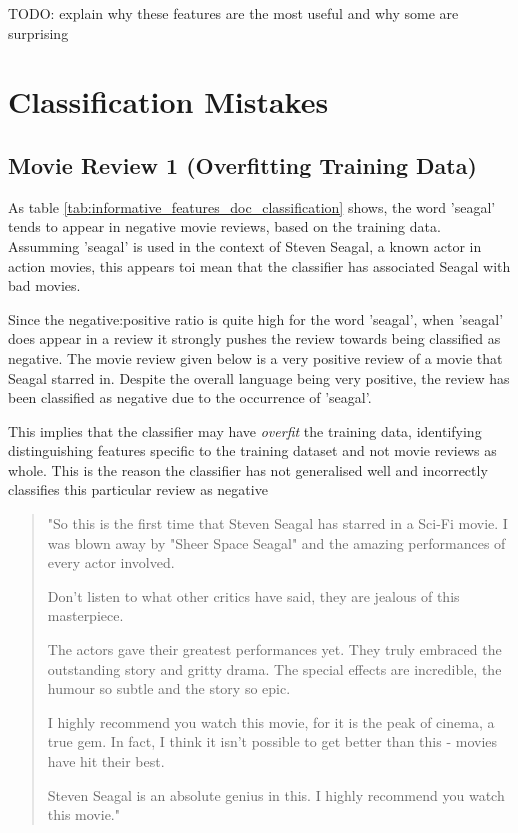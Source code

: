 \documentclass{article}
\begin{document}
TODO: explain why these features are the most useful and why some are surprising

\section {Classification Mistakes}

\subsection{Movie Review 1 (Overfitting Training Data)}

As table \ref{tab:informative_features_doc_classification} shows, the word 'seagal' tends to appear in negative movie reviews, based on the training data. Assumming 'seagal' is used in the context of Steven Seagal, a known actor in action movies, this appears toi mean that the classifier has associated Seagal with bad movies.

Since the negative:positive ratio is quite high for the word 'seagal', when 'seagal' does appear in a review it strongly pushes the review towards being classified as negative. The movie review given below is a very positive review of a movie that Seagal starred in. Despite the overall language being very positive, the review has been classified as negative due to the occurrence of 'seagal'.

This implies that the classifier may have \textit{overfit} the training data, identifying distinguishing features specific to the training dataset and not movie reviews as whole. This is the reason the classifier has not generalised well and incorrectly classifies this particular review as negative

\begin{quote}
"So this is the first time that Steven Seagal has starred in a Sci-Fi movie. I was blown away by "Sheer Space Seagal" and the amazing performances of every actor involved.

Don't listen to what other critics have said, they are jealous of this masterpiece.

The actors gave their greatest performances yet. They truly embraced the outstanding story and gritty drama. The special effects are incredible, the humour so subtle and the story so epic.

I highly recommend you watch this movie, for it is the peak of cinema, a true gem. In fact, I think it isn't possible to get better than this - movies have hit their best.

Steven Seagal is an absolute genius in this. I highly recommend you watch this movie."
\end{quote}
\end{document}

